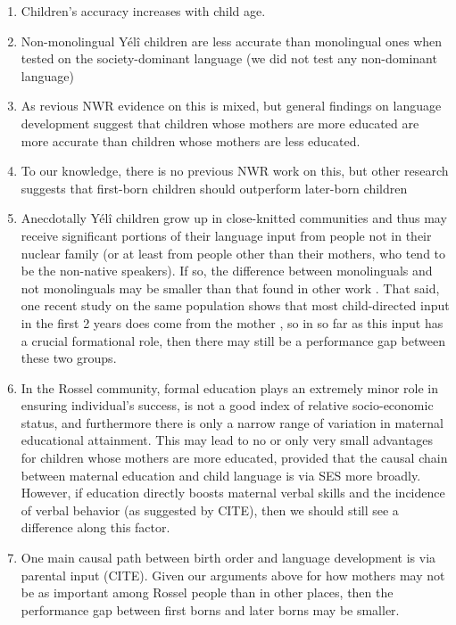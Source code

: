 \documentclass[english,,man,floatsintext]{apa6}
\begin{document}
\begin{enumerate}
\def\labelenumi{\arabic{enumi}.}
\setcounter{enumi}{2}
\item
  Children's accuracy increases with child age.
\item
  Non-monolingual Yélî children are less accurate than monolingual ones
  when tested on the society-dominant language (we did not test any
  non-dominant language) 
\item
  As revious NWR evidence on this is mixed, but general findings on
  language development suggest that children whose mothers are more
  educated are more accurate than children whose mothers are less
  educated.
\item
  To our knowledge, there is no previous NWR work on this, but other
  research suggests that first-born children should outperform
  later-born children
\item
  Anecdotally Yélî children grow up in close-knitted communities and
  thus may receive significant portions of their language input from
  people not in their nuclear family (or at least from people other than
  their mothers, who tend to be the non-native speakers). If so, the
  difference between monolinguals and not monolinguals may be smaller
  than that found in other work . That said, one recent study on the
  same population shows that most child-directed input in the first 2
  years does come from the mother , so in so far as this input has a
  crucial formational role, then there may still be a performance gap
  between these two groups.
\item
  In the Rossel community, formal education plays an extremely minor
  role in ensuring individual's success, is not a good index of relative
  socio-economic status, and furthermore there is only a narrow range of
  variation in maternal educational attainment. This may lead to no or
  only very small advantages for children whose mothers are more
  educated, provided that the causal chain between maternal education
  and child language is via SES more broadly. However, if education
  directly boosts maternal verbal skills and the incidence of verbal
  behavior (as suggested by CITE), then we should still see a difference
  along this factor.
\item
  One main causal path between birth order and language development is
  via parental input (CITE). Given our arguments above for how mothers
  may not be as important among Rossel people than in other places, then
  the performance gap between first borns and later borns may be
  smaller.
\end{enumerate}
\end{document}
